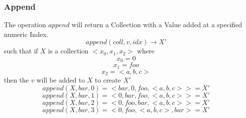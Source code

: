 \documentclass[../main.tex]{subfiles}
\begin{document}
\subsubsection{Append}

The operation $append$ will return a Collection with a Value added at a specified numeric Index.
$$append(coll, v, idx) \to X'$$
such that if $X$ is a collection $<x_{0}, x_{1}, x_{2}>$
where
$$x_{0} = 0$$
$$x_{1} = foo$$
$$x_{2} = <a, b, c>$$
then the $v$ will be added to $X$ to create $X'$
$$append(X, bar, 0) = <bar, 0, foo, <a, b, c> > = X'$$
$$append(X, bar, 1) = <0, bar, foo, <a, b, c> > = X'$$
$$append(X, bar, 2) = <0, foo, bar, <a, b, c> > = X'$$
$$append(X, bar, 3) = <0, foo, <a, b, c> , bar > = X'$$
\end{document}
